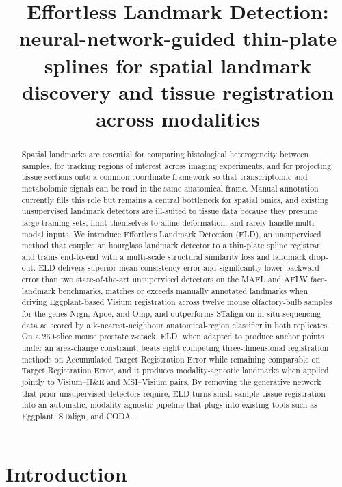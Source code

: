 \documentclass[11pt]{article}
\title{Effortless Landmark Detection: neural-network-guided thin-plate splines for spatial landmark discovery and tissue registration across modalities}
\author{}
\date{}
\begin{document}
\maketitle

\begin{abstract}
Spatial landmarks are essential for comparing histological heterogeneity between samples, for tracking regions of interest across imaging experiments, and for projecting tissue sections onto a common coordinate framework so that transcriptomic and metabolomic signals can be read in the same anatomical frame. Manual annotation currently fills this role but remains a central bottleneck for spatial omics, and existing unsupervised landmark detectors are ill-suited to tissue data because they presume large training sets, limit themselves to affine deformation, and rarely handle multi-modal inputs. We introduce Effortless Landmark Detection (ELD), an unsupervised method that couples an hourglass landmark detector to a thin-plate spline registrar and trains end-to-end with a multi-scale structural similarity loss and landmark drop-out. ELD delivers superior mean consistency error and significantly lower backward error than two state-of-the-art unsupervised detectors on the MAFL and AFLW face-landmark benchmarks, matches or exceeds manually annotated landmarks when driving Eggplant-based Visium registration across twelve mouse olfactory-bulb samples for the genes Nrgn, Apoe, and Omp, and outperforms STalign on in situ sequencing data as scored by a k-nearest-neighbour anatomical-region classifier in both replicates. On a 260-slice mouse prostate z-stack, ELD, when adapted to produce anchor points under an area-change constraint, beats eight competing three-dimensional registration methods on Accumulated Target Registration Error while remaining comparable on Target Registration Error, and it produces modality-agnostic landmarks when applied jointly to Visium--H\&E and MSI--Visium pairs. By removing the generative network that prior unsupervised detectors require, ELD turns small-sample tissue registration into an automatic, modality-agnostic pipeline that plugs into existing tools such as Eggplant, STalign, and CODA.
\end{abstract}

\section{Introduction}
\end{document}
